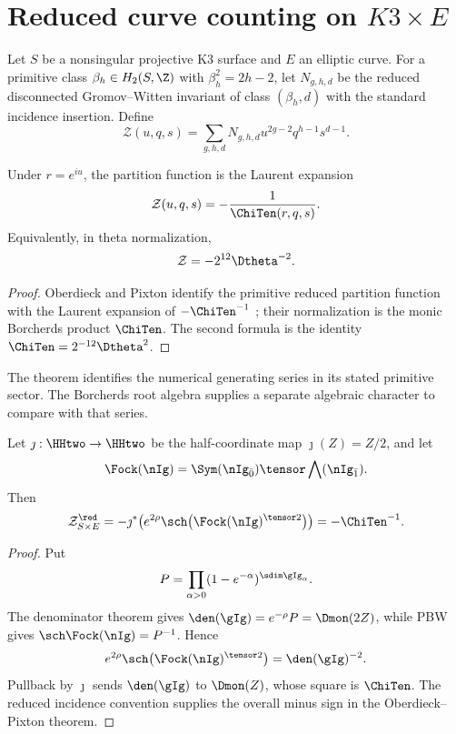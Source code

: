 \chapter{Reduced curve counting on \texorpdfstring{$K3\times E$}{K3 x E}}
Let $S$ be a nonsingular projective K3 surface and $E$ an elliptic curve. For a primitive class $\beta_h\in H_2(S,\Z)$ with $\beta_h^2=2h-2$, let $N_{g,h,d}$ be the reduced disconnected Gromov--Witten invariant of class $(\beta_h,d)$ with the standard incidence insertion. Define
\[
 \mathcal Z(u,q,s)=
 \sum_{g,h,d}N_{g,h,d}u^{2g-2}q^{h-1}s^{d-1}.
\]

\begin{theorem}
Under $r=e^{iu}$, the partition function is the Laurent expansion
\[
 \mathcal Z(u,q,s)=-\frac1{\ChiTen(r,q,s)}.
\]
Equivalently, in theta normalization,
\[
 \mathcal Z=-2^{12}\Dtheta^{-2}.
\]
\end{theorem}
\begin{proof}
Oberdieck and Pixton identify the primitive reduced partition function with the Laurent expansion of $-\ChiTen^{-1}$ \cite{OP}; their normalization is the monic Borcherds product $\ChiTen$. The second formula is the identity $\ChiTen=2^{-12}\Dtheta^2$.
\end{proof}

The theorem identifies the numerical generating series in its stated
primitive sector. The Borcherds root algebra supplies a separate
algebraic character to compare with that series.

\begin{corollary}
Let $\jmath:\HHtwo\to\HHtwo$ be the half-coordinate map $\jmath(Z)=Z/2$, and let
\[
 \Fock(\nIg)=
 \Sym(\nIg_{\bar0})\tensor\bigwedge(\nIg_{\bar1}).
\]
Then
\[
 \mathcal Z^{\red}_{S\times E}
 =-\jmath^*\!\left(
 e^{2\rho}\sch\bigl(\Fock(\nIg)^{\tensor2}\bigr)
 \right)
 =-\ChiTen^{-1}.
\]
\end{corollary}
\begin{proof}
Put
\[
 P=\prod_{\alpha>0}(1-e^{-\alpha})^{\sdim\gIg_\alpha}.
\]
The denominator theorem gives $\den(\gIg)=e^{-\rho}P=\Dmon(2Z)$, while PBW gives $\sch\Fock(\nIg)=P^{-1}$.  Hence
\[
 e^{2\rho}\sch\bigl(\Fock(\nIg)^{\tensor2}\bigr)
 =\den(\gIg)^{-2}.
\]
Pullback by $\jmath$ sends $\den(\gIg)$ to $\Dmon(Z)$, whose square is $\ChiTen$.  The reduced incidence convention supplies the overall minus sign in the Oberdieck--Pixton theorem.
\end{proof}

